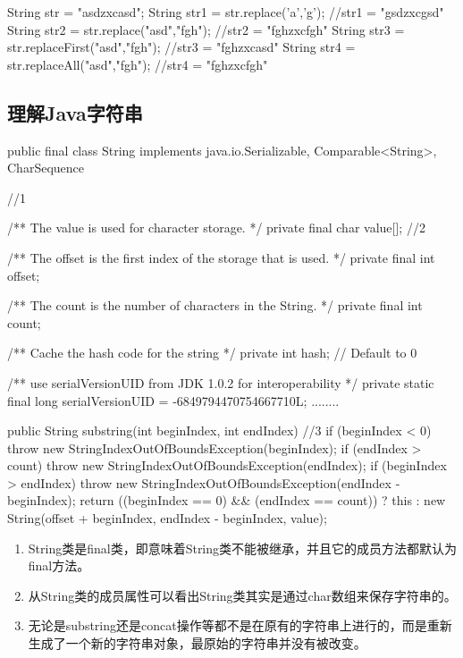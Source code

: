 
\begin{javaCode}
  String str = "asdzxcasd";
  String str1 = str.replace('a','g'); //str1 = "gsdzxcgsd"
  String str2 = str.replace("asd","fgh"); //str2 = "fghzxcfgh"
  String str3 = str.replaceFirst("asd","fgh"); //str3 = "fghzxcasd"
  String str4 = str.replaceAll("asd","fgh"); //str4 = "fghzxcfgh"
\end{javaCode}

\subsection{理解Java字符串}


\begin{javaCode}
  public final class String
  implements java.io.Serializable, Comparable<String>, CharSequence { //1

    /** The value is used for character storage. */
    private final char value[]; //2
    
    /** The offset is the first index of the storage that is used. */
    private final int offset;
    
    /** The count is the number of characters in the String. */
    private final int count;
    
    /** Cache the hash code for the string */
    private int hash; // Default to 0

    /** use serialVersionUID from JDK 1.0.2 for interoperability */
    private static final long serialVersionUID = -6849794470754667710L;
    ........

    public String substring(int beginIndex, int endIndex) { //3
      if (beginIndex < 0) {
        throw new StringIndexOutOfBoundsException(beginIndex);
      }
      if (endIndex > count) {
        throw new StringIndexOutOfBoundsException(endIndex);
      }
      if (beginIndex > endIndex) {
        throw new StringIndexOutOfBoundsException(endIndex - beginIndex);
      }
      return ((beginIndex == 0) && (endIndex == count)) ? this :
      new String(offset + beginIndex, endIndex - beginIndex, value);
    }
}
\end{javaCode}

\begin{enumerate}
\item String类是final类，即意味着String类不能被继承，并且它的成员方法都默认为final方法。
\item 从String类的成员属性可以看出String类其实是通过char数组来保存字符串的。
\item 无论是substring还是concat操作等都不是在原有的字符串上进行的，而是重新生成了一个新的字符串对象，最原始的字符串并没有被改变。

\end{enumerate}

